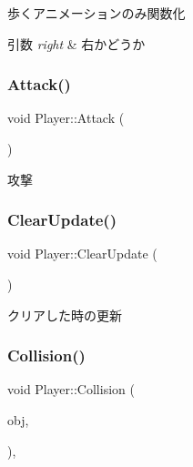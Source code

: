 歩くアニメーションのみ関数化 


\begin{DoxyParams}{引数}
{\em right} & 右かどうか \\
\hline
\end{DoxyParams}
\mbox{\label{class_player_a6c879db24d39d894207e078eb4c56e8d}} 
\subsubsection{\texorpdfstring{Attack()}{Attack()}}
{\footnotesize\ttfamily void Player\+::\+Attack (\begin{DoxyParamCaption}{ }\end{DoxyParamCaption})}



攻撃 

\mbox{\label{class_player_a8b27da2bdfb3e25337c7b6fd345d21f2}} 
\subsubsection{\texorpdfstring{Clear\+Update()}{ClearUpdate()}}
{\footnotesize\ttfamily void Player\+::\+Clear\+Update (\begin{DoxyParamCaption}{ }\end{DoxyParamCaption})\hspace{0.3cm}{\ttfamily [inline]}}



クリアした時の更新 

\mbox{\label{class_player_a992b5c7e0d981308ed56706c6e71a709}} 
\subsubsection{\texorpdfstring{Collision()}{Collision()}}
{\footnotesize\ttfamily void Player\+::\+Collision (\begin{DoxyParamCaption}\item[{\mbox{\hyperlink{class_object_base}{Object\+Base}} $\ast$}]{obj,  }\item[{\mbox{\hyperlink{common_8h_ae148fff5818e9444b4ab2288829559bf}{Vec2}}}]{ }\end{DoxyParamCaption})\hspace{0.3cm}{\ttfamily [final]}, {\ttfamily [virtual]}}



